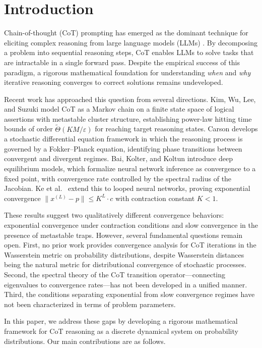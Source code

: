 \section{Introduction}\label{sec:intro}

Chain-of-thought (CoT) prompting has emerged as the dominant technique for
eliciting complex reasoning from large language models (LLMs)
\cite{wei2022chain}. By decomposing a problem into sequential reasoning steps,
CoT enables LLMs to solve tasks that are intractable in a single forward pass.
Despite the empirical success of this paradigm, a rigorous mathematical
foundation for understanding \emph{when} and \emph{why} iterative reasoning
converges to correct solutions remains undeveloped.

Recent work has approached this question from several directions. Kim, Wu, Lee,
and Suzuki \cite{kim2025metastable} model CoT as a Markov chain on a finite
state space of logical assertions with metastable cluster structure,
establishing power-law hitting time bounds of order $\widetilde{\Theta}(KM/\varepsilon)$
for reaching target reasoning states. Carson \cite{carson2025stochastic}
develops a stochastic differential equation framework in which the reasoning
process is governed by a Fokker--Planck equation, identifying phase transitions
between convergent and divergent regimes. Bai, Kolter, and Koltun
\cite{bai2019deep} introduce deep equilibrium models, which formalize neural
network inference as convergence to a fixed point, with convergence rate
controlled by the spectral radius of the Jacobian. Ke et al.\
\cite{ke2024fixed} extend this to looped neural networks, proving exponential
convergence $\|x^{(L)} - p\| \le K^L \cdot c$ with contraction constant $K < 1$.

These results suggest two qualitatively different convergence behaviors:
exponential convergence under contraction conditions and slow convergence in the
presence of metastable traps. However, several fundamental questions remain open.
First, no prior work provides convergence analysis for CoT iterations in the
Wasserstein metric on probability distributions, despite Wasserstein distances
being the natural metric for distributional convergence of stochastic processes.
Second, the spectral theory of the CoT transition operator---connecting
eigenvalues to convergence rates---has not been developed in a unified manner.
Third, the conditions separating exponential from slow convergence regimes have
not been characterized in terms of problem parameters.

In this paper, we address these gaps by developing a rigorous mathematical
framework for CoT reasoning as a discrete dynamical system on probability
distributions. Our main contributions are as follows.

